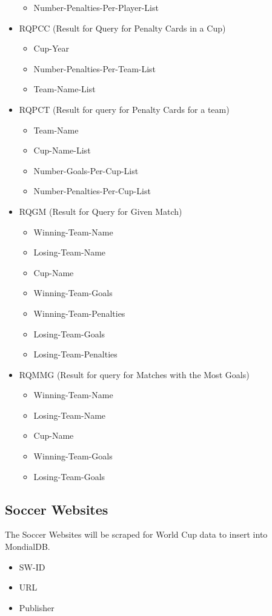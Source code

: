 \documentclass{article}
\begin{document}
\begin{itemize}
\begin{itemize}
			\item Number-Penalties-Per-Player-List
		\end{itemize}
	\item RQPCC (Result for Query for Penalty Cards in a Cup)
	\begin{itemize}
		\item Cup-Year
		\item Number-Penalties-Per-Team-List
		\item Team-Name-List
	\end{itemize}
	\item RQPCT (Result for query for Penalty Cards for a team)
	\begin{itemize}
		\item Team-Name
		\item Cup-Name-List
		\item Number-Goals-Per-Cup-List
		\item Number-Penalties-Per-Cup-List
	\end{itemize}
	\item RQGM (Result for Query for Given Match) 
	\begin{itemize}
		\item Winning-Team-Name
		\item Losing-Team-Name
		\item Cup-Name
		\item Winning-Team-Goals
		\item Winning-Team-Penalties
		\item Losing-Team-Goals
		\item Losing-Team-Penalties
	\end{itemize}
	\item RQMMG (Result for query for Matches with the Most Goals) 
	\begin{itemize}
		\item Winning-Team-Name
		\item Losing-Team-Name
		\item Cup-Name
		\item Winning-Team-Goals
		\item Losing-Team-Goals
	\end{itemize}
\end{itemize}


\subsection{Soccer Websites}
The Soccer Websites will be scraped for World Cup data to insert into MondialDB.
\begin{itemize}
	\item SW-ID
	\item URL
	\item Publisher
\end{itemize}
\end{document}
